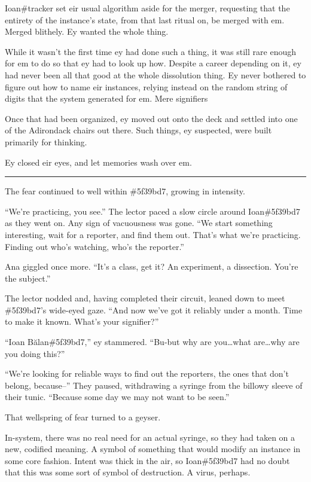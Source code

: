 Ioan\#tracker set eir usual algorithm aside for the merger, requesting that the entirety of the instance's state, from that last ritual on, be merged with em. Merged blithely. Ey wanted the whole thing.

While it wasn't the first time ey had done such a thing, it was still rare enough for em to do so that ey had to look up how. Despite a career depending on it, ey had never been all that good at the whole dissolution thing. Ey never bothered to figure out how to name eir instances, relying instead on the random string of digits that the system generated for em. Mere signifiers

Once that had been organized, ey moved out onto the deck and settled into one of the Adirondack chairs out there. Such things, ey suspected, were built primarily for thinking.

Ey closed eir eyes, and let memories wash over em.

\begin{center}\rule{0.5\linewidth}{\linethickness}\end{center}

The fear continued to well within \#5f39bd7, growing in intensity.

``We're practicing, you see.'' The lector paced a slow circle around Ioan\#5f39bd7 as they went on. Any sign of vacuousness was gone. ``We start something interesting, wait for a reporter, and find them out. That's what we're practicing. Finding out who's watching, who's the reporter.''

Ana giggled once more. ``It's a class, get it? An experiment, a dissection. You're the subject.''

The lector nodded and, having completed their circuit, leaned down to meet \#5f39bd7's wide-eyed gaze. ``And now we've got it reliably under a month. Time to make it known. What's your signifier?''

``Ioan Bălan\#5f39bd7,'' ey stammered. ``Bu-but why are you\ldots{}what are\ldots{}why are you doing this?''

``We're looking for reliable ways to find out the reporters, the ones that don't belong, because--'' They paused, withdrawing a syringe from the billowy sleeve of their tunic. ``Because some day we may not want to be seen.''

That wellspring of fear turned to a geyser.

In-system, there was no real need for an actual syringe, so they had taken on a new, codified meaning. A symbol of something that would modify an instance in some core fashion. Intent was thick in the air, so Ioan\#5f39bd7 had no doubt that this was some sort of symbol of destruction. A virus, perhaps.

